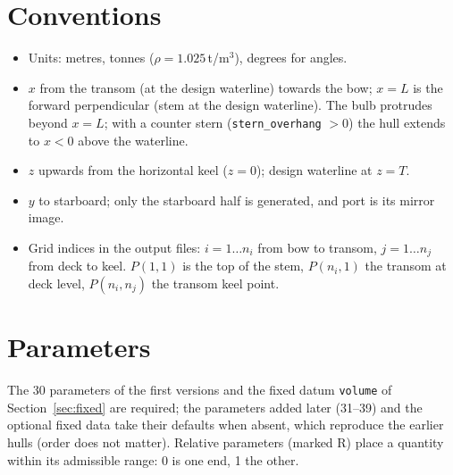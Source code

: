 \documentclass[11pt,a4paper]{article}
\newcommand{\cmd}[1]{\texttt{#1}}
\begin{document}
\section{Conventions}
\begin{itemize}
\item Units: metres, tonnes ($\rho = 1.025$\,t/m$^3$), degrees for angles.
\item $x$ from the transom (at the design waterline) towards the bow; $x=L$ is the forward
  perpendicular (stem at the design waterline). The bulb protrudes beyond $x=L$; with a counter
  stern (\cmd{stern\_overhang} $>0$) the hull extends to $x<0$ above the waterline.
\item $z$ upwards from the horizontal keel ($z=0$); design waterline at $z=T$.
\item $y$ to starboard; only the starboard half is generated, and port is its mirror image.
\item Grid indices in the output files: $i = 1 \dots n_i$ from bow to transom, $j = 1 \dots n_j$
  from deck to keel. $P(1,1)$ is the top of the stem, $P(n_i,1)$ the transom at deck level,
  $P(n_i,n_j)$ the transom keel point.
\end{itemize}

\section{Parameters}
\label{sec:params}
The 30 parameters of the first versions and the fixed datum \cmd{volume} of
Section~\ref{sec:fixed} are required; the parameters added later (31--39) and the optional fixed
data take their defaults when absent, which reproduce the earlier hulls (order does not matter). Relative parameters (marked R) place a quantity
within its admissible range: 0 is one end, 1 the other.
\end{document}
